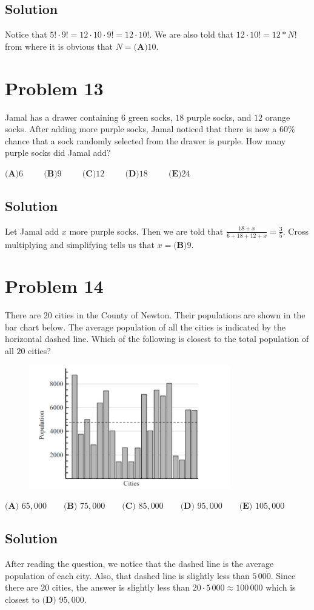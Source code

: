 \documentclass{article}
\begin{document}
\subsection{Solution}
Notice that $5!\cdot 9!=12\cdot 10\cdot 9!=12\cdot 10!$. We are also told that $12\cdot 10!=12*N!$ from where it is obvious that $N=\textbf{(A)}10$.
\section{Problem 13}
Jamal has a drawer containing $6$ green socks, $18$ purple socks, and $12$ orange socks. After adding more purple socks, Jamal noticed that there is now a $60\%$ chance that a sock randomly selected from the drawer is purple. How many purple socks did Jamal add?

$\textbf{(A)}6\qquad~~\textbf{(B)}9\qquad~~\textbf{(C)}12\qquad~~\textbf{(D)}18\qquad~~\textbf{(E)}24$
\subsection{Solution}
Let Jamal add $x$ more purple socks. Then we are told that $\frac{18+x}{6+18+12+x}=\frac35$.  Cross multiplying and simplifying tells us that $x=\textbf{(B)}9$.
\section{Problem 14}
There are $20$ cities in the County of Newton. Their populations are shown in the bar chart below. The average population of all the cities is indicated by the horizontal dashed line. Which of the following is closest to the total population of all $20$ cities?


\begin{figure}[ht]
\centering
\includegraphics[width=.5\textwidth]{2020 AMC 8 Problem 14.png}
\end{figure}

$\textbf{(A) }65{,}000 \qquad \textbf{(B) }75{,}000 \qquad \textbf{(C) }85{,}000 \qquad \textbf{(D) }95{,}000 \qquad \textbf{(E) }105{,}000$
\subsection{Solution}
After reading the question, we notice that the dashed line is the average population of each city. Also, that dashed line is slightly less than $5\,000$. Since there are $20$ cities, the answer is slightly less than $20\cdot 5\,000\approx 100\,000$ which is closest to $\textbf{(D) }95{,}000$.
\end{document}
